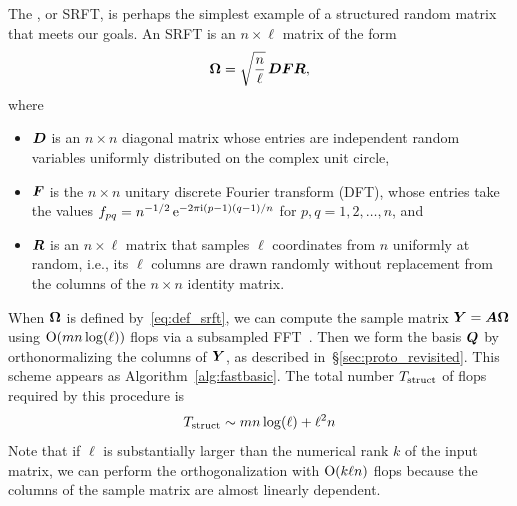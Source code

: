 \documentclass{article}
\begin{document}
The , or SRFT, is perhaps the
simplest example of a structured random matrix that meets our goals.
An SRFT is an $n \times \ell$ matrix of the form
\begin{equation}
\label{eq:def_srft}
\bm{\Omega} = \sqrt{\frac{n}{\ell}} \, \bm{DFR},
\end{equation}
where
\lsp
\begin{itemize}
\item   $\bm{D}$ is an $n \times n$ diagonal matrix whose entries are
independent random variables uniformly distributed on the complex unit circle,

\item   $\bm{F}$ is the $n \times n$ unitary discrete Fourier transform (DFT),
whose entries take the values $f_{pq} = n^{-1/2} \, \mathrm{e}^{-2\pi\mathrm{i} (p-1)(q-1)/n}$ for $p, q = 1, 2, \dots, n$, and

\item   $\bm{R}$ is an $n \times \ell$ matrix that samples $\ell$ coordinates
from $n$ uniformly at random, i.e., its $\ell$ columns are drawn randomly
without replacement from the columns of the $n \times n$ identity matrix.
\end{itemize}
\lsp

When $\bm{\Omega}$ is defined by~\eqref{eq:def_srft}, we can compute the sample
matrix $\bm{Y} = \bm{A\Omega}$ using $\mathrm{O}(mn\log(\ell))$ flops via a
subsampled FFT~\cite{random2}.
Then we form the basis $\bm{Q}$ by orthonormalizing
the columns of $\bm{Y}$, as described in~\S\ref{sec:proto_revisited}.
This scheme appears as Algorithm~\ref{alg:fastbasic}.
The total number $T_{\rm struct}$ of flops required by this procedure is
\begin{equation}
\label{eq:cost_SRFT}
T_{\rm struct} \sim mn \log(\ell) + \ell^2 n
\end{equation}
%
Note that if $\ell$ is substantially larger than the numerical rank $k$
of the input matrix, we can perform the orthogonalization with $\mathrm{O}( k \ell n)$
flops because the columns of the sample matrix are almost linearly dependent.
\end{document}
